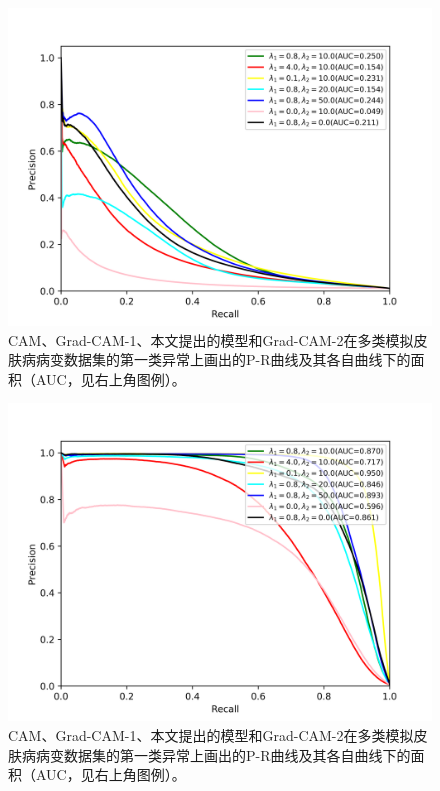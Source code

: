 \begin{figure}[!htbp]
	\centering
	\includegraphics[width=1.0\textwidth]{figure/pr_curve_multi_skin_hyper_paras/IMAGE_NET_pr_curve.png}
	\caption{CAM、Grad-CAM-1、本文提出的模型和Grad-CAM-2在多类模拟皮肤病病变数据集的第一类异常上画出的P-R曲线及其各自曲线下的面积（AUC，见右上角图例）。} 
	\label{fig:multi_simulate_pr_curve_image_net_hyper_paras}
\end{figure}

\begin{figure}[!htbp]
	\centering
	\includegraphics[width=1.0\textwidth]{figure/pr_curve_multi_skin_hyper_paras/SKIN_pr_curve.png}
	\caption{CAM、Grad-CAM-1、本文提出的模型和Grad-CAM-2在多类模拟皮肤病病变数据集的第一类异常上画出的P-R曲线及其各自曲线下的面积（AUC，见右上角图例）。} 
	\label{fig:multi_simulate_pr_curve_skin_hyper_paras}
\end{figure}

